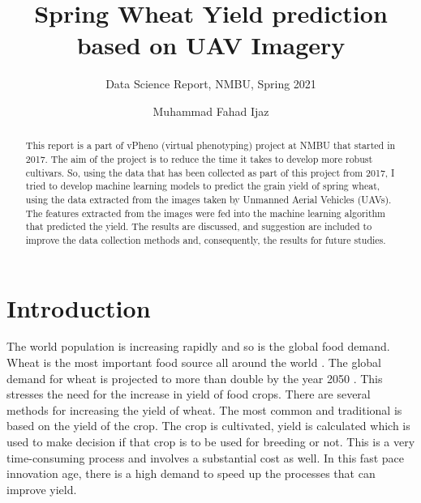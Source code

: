 \documentclass[sigconf, nonacm, natbib, screen, balance=False]{acmart}
\begin{document}
\title{Spring Wheat Yield prediction based on UAV Imagery}
\subtitle{Data Science Report, NMBU, Spring 2021}

\author{Muhammad Fahad Ijaz}

\begin{abstract}
  This report is a part of vPheno (virtual phenotyping) project at NMBU that started in 2017. The aim of the project is to reduce the time it takes to develop more robust cultivars. So, using the data that has been collected as part of this project from 2017, I tried to develop machine learning models to predict the grain yield of spring wheat, using the data extracted from the images taken by Unmanned Aerial Vehicles (UAVs). The features extracted from the images were fed into the machine learning algorithm that predicted the yield. The results are discussed, and suggestion are included to improve the data collection methods and, consequently, the results for future studies.
\end{abstract}


\maketitle

\section{Introduction}\label{sec:intro}

The world population is increasing rapidly  and so is the global food demand. Wheat is the most important food source all around the world \cite{Igrejas2020}. The global demand for wheat is projected to more than double by the year 2050 \cite{tilman}. This stresses the need for the increase in yield of food crops.
There are several methods for increasing the yield of wheat. The most common and traditional is based on the yield of the crop.
 The crop is cultivated, yield is calculated which is used to make decision if that crop is to be used for breeding or not. This is a very time-consuming process and involves a substantial cost as well. In this fast pace innovation age, there is a high demand to speed up the processes that can improve yield. 
\end{document}
